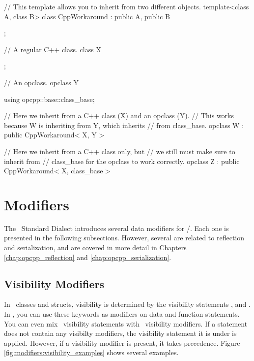 \begin{opcpp}[label={fig:inheritance:cpp_workaround},caption={Inheriting from \cpp\ classes.}]
// This template allows you to inherit from two different objects.
template<class A, class B>
class CppWorkaround : public A, public B
{

};

// A regular C++ class.
class X
{

};

// An opclass.
opclass Y
{

}

using opcpp::base::class_base;

// Here we inherit from a C++ class (X) and an opclass (Y).
// This works because W is inheriting from Y, which inherits
// from class_base.
opclass W : public CppWorkaround< X, Y >
{

}

// Here we inherit from a C++ class only, but 
// we still must make sure to inherit from
// class_base for the opclass to work correctly.
opclass Z : public CppWorkaround< X, class_base >
{

}
\end{opcpp}

\section{Modifiers}
\label{sec:opcpp_modifiers}

The \opCPP\ Standard Dialect introduces several data modifiers for /.  Each one is presented in the following subsections.  However, several are related to reflection and serialization, and are covered in more detail in Chapters \ref{chap:opcpp_reflection} and \ref{chap:opcpp_serialization}.

\subsection{Visibility Modifiers}
\label{subsec:modifiers:visibility}

In \cpp\ classes and structs, visibility is determined by the visibility statements ,  and .  In \opCPP, you can use these keywords as modifiers on data and function statements.  You can even mix \cpp\ visibility statements with \opCPP\ visibility modifiers.  If a statement does not contain any visibilty modifiers, the visibility statement it is under is applied.  However, if a visibility modifier is present, it takes precedence.  Figure \ref{fig:modifiers:visibility_examples} shows several examples.

